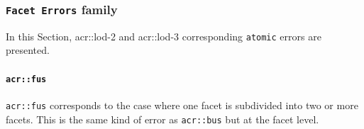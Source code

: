         \subsubsection{\texttt{Facet Errors} family}
            In this Section, \gls{acr::lod}-2 and \gls{acr::lod}-3 corresponding \texttt{atomic} errors are presented.

            \paragraph{\texttt{\acrlong*{acr::fus}}}
                \texttt{\gls{acr::fus}} corresponds to the case where one facet is subdivided into two or more facets.
                This is the same kind of error as \texttt{\gls{acr::bus}} but at the facet level.\\


